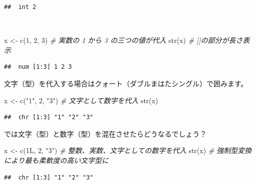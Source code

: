 \documentclass[
  12pt,
]{book}
\newenvironment{Shaded}{\begin{snugshade}}{\end{snugshade}}
\newcommand{\CommentTok}[1]{\textcolor[rgb]{0.56,0.35,0.01}{\textit{#1}}}
\newcommand{\DecValTok}[1]{\textcolor[rgb]{0.00,0.00,0.81}{#1}}
\newcommand{\FunctionTok}[1]{\textcolor[rgb]{0.00,0.00,0.00}{#1}}
\newcommand{\NormalTok}[1]{#1}
\newcommand{\OtherTok}[1]{\textcolor[rgb]{0.56,0.35,0.01}{#1}}
\newcommand{\StringTok}[1]{\textcolor[rgb]{0.31,0.60,0.02}{#1}}
\begin{document}
\begin{verbatim}
##  int 2
\end{verbatim}

　

\begin{Shaded}
\begin{Highlighting}[numbers=left,,]
\NormalTok{x }\OtherTok{\textless{}{-}} \FunctionTok{c}\NormalTok{(}\DecValTok{1}\NormalTok{, }\DecValTok{2}\NormalTok{, }\DecValTok{3}\NormalTok{)         }\CommentTok{\# 実数の 1 から 3 の三つの値が代入}
\FunctionTok{str}\NormalTok{(x)                  }\CommentTok{\# []の部分が長さ表示}
\end{Highlighting}
\end{Shaded}

\begin{verbatim}
##  num [1:3] 1 2 3
\end{verbatim}

文字（型）を代入する場合はクォート（ダブルまはたシングル）で囲みます。

\begin{Shaded}
\begin{Highlighting}[numbers=left,,]
\NormalTok{x }\OtherTok{\textless{}{-}} \FunctionTok{c}\NormalTok{(}\StringTok{"1"}\NormalTok{, }\StringTok{\textquotesingle{}2\textquotesingle{}}\NormalTok{, }\StringTok{"3"}\NormalTok{)   }\CommentTok{\# 文字として数字を代入}
\FunctionTok{str}\NormalTok{(x)}
\end{Highlighting}
\end{Shaded}

\begin{verbatim}
##  chr [1:3] "1" "2" "3"
\end{verbatim}

では文字（型）と数字（型）を混在させたらどうなるでしょう？

\begin{Shaded}
\begin{Highlighting}[numbers=left,,]
\NormalTok{x }\OtherTok{\textless{}{-}} \FunctionTok{c}\NormalTok{(1L, }\DecValTok{2}\NormalTok{, }\StringTok{"3"}\NormalTok{)      }\CommentTok{\# 整数、実数、文字としての数字を代入}
\FunctionTok{str}\NormalTok{(x)                  }\CommentTok{\# 強制型変換により最も柔軟度の高い文字型に}
\end{Highlighting}
\end{Shaded}

\begin{verbatim}
##  chr [1:3] "1" "2" "3"
\end{verbatim}
\end{document}
